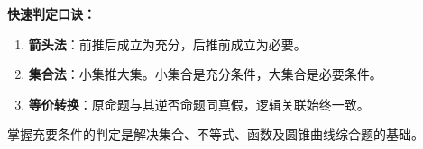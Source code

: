 \begin{summarybox}
\textbf{快速判定口诀：}
\begin{enumerate}
    \item \textbf{箭头法}：前推后成立为充分，后推前成立为必要。
    \item \textbf{集合法}：小集推大集。小集合是充分条件，大集合是必要条件。
    \item \textbf{等价转换}：原命题与其逆否命题同真假，逻辑关联始终一致。
\end{enumerate}
掌握充要条件的判定是解决集合、不等式、函数及圆锥曲线综合题的基础。
\end{summarybox}